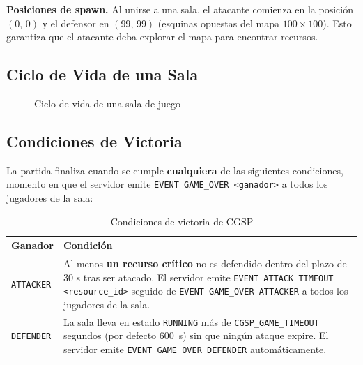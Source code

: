 \documentclass[12pt, letterpaper]{article}
\begin{document}
\begin{nota}
\textbf{Posiciones de spawn.} Al unirse a una sala, el atacante comienza en la posición $(0,\,0)$ y el defensor en $(99,\,99)$ (esquinas opuestas del mapa $100\times100$). Esto garantiza que el atacante deba explorar el mapa para encontrar recursos.
\end{nota}

\subsection{Ciclo de Vida de una Sala}

\begin{figure}[H]
\centering
{}
\caption{Ciclo de vida de una sala de juego}
\end{figure}

\subsection{Condiciones de Victoria}
\label{sec:victoria}

La partida finaliza cuando se cumple \textbf{cualquiera} de las siguientes condiciones,
momento en que el servidor emite \texttt{EVENT GAME\_OVER <ganador>} a todos los
jugadores de la sala:

\begin{table}[H]
\centering
\begin{tabularx}{\textwidth}{l X}
\toprule
\textbf{Ganador} & \textbf{Condición} \\
\midrule
\texttt{ATTACKER} & Al menos \textbf{un recurso crítico} no es defendido dentro del plazo de 30 s tras ser atacado. El servidor emite \texttt{EVENT ATTACK\_TIMEOUT <resource\_id>} seguido de \texttt{EVENT GAME\_OVER ATTACKER} a todos los jugadores de la sala. \\[6pt]
\texttt{DEFENDER} & La sala lleva en estado \texttt{RUNNING} más de \texttt{CGSP\_GAME\_TIMEOUT} segundos (por defecto 600~s) sin que ningún ataque expire. El servidor emite \texttt{EVENT GAME\_OVER DEFENDER} automáticamente. \\
\bottomrule
\end{tabularx}
\caption{Condiciones de victoria de CGSP}
\end{table}
\end{document}
